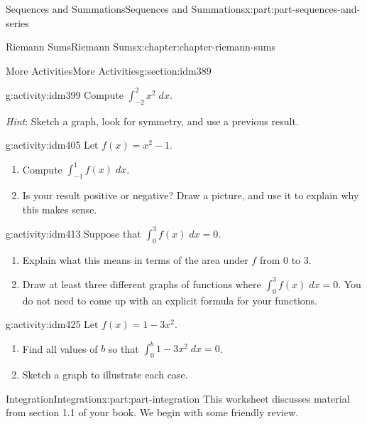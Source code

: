 \documentclass[oneside,10pt,]{book}
\begin{document}
\begin{partptx}{Sequences and Summations}{}{Sequences and Summations}{}{}{x:part:part-sequences-and-series}
\begin{chapterptx}{Riemann Sums}{}{Riemann Sums}{}{}{x:chapter:chapter-riemann-sums}
\begin{sectionptx}{More Activities}{}{More Activities}{}{}{g:section:idm389}
\begin{activity}{}{g:activity:idm399}
Compute \(\displaystyle\int_{-2}^2 x^2 \;dx\).%
\par
\emph{Hint}: Sketch a graph, look for symmetry, and use a previous result.%
\end{activity}
\begin{activity}{}{g:activity:idm405}%
Let \(f(x) = x^2 -1 \).%
\begin{enumerate}[font=\bfseries,label=(\alph*),ref=\alph*]
\item{}Compute \(\displaystyle \int_{-1}^1 f(x)\; dx\).\item{}Is your result positive or negative? Draw a picture, and use it to explain why this makes sense.%
\end{enumerate}
\end{activity}
\begin{activity}{}{g:activity:idm413}%
Suppose that \(\displaystyle \int_0^3 f(x)\;dx = 0\).%
\begin{enumerate}[font=\bfseries,label=(\alph*),ref=\alph*]
\item{}Explain what this means in terms of the area under \(f\) from \(0\) to \(3\).%
\item{}Draw at least three different graphs of functions where \(\displaystyle \int_0^3 f(x)\;dx = 0\). You do not need to come up with an explicit formula for your functions.%
\end{enumerate}
\end{activity}
\begin{activity}{}{g:activity:idm425}%
Let \(f(x) = 1-3x^2\).%
\begin{enumerate}[font=\bfseries,label=(\alph*),ref=\alph*]
\item{}Find all values of \(b\) so that \(\displaystyle\int_0^b 1-3x^2\; dx = 0\).%
\item{}Sketch a graph to illustrate each case.%
\end{enumerate}
\end{activity}
\end{sectionptx}
\end{chapterptx}
\end{partptx}
%
%
\typeout{************************************************}
\typeout{************************************************}
%
\begin{partptx}{Integration}{}{Integration}{}{}{x:part:part-integration}
 This worksheet discusses material from section 1.1 of your book. We begin with some friendly review.%
\end{partptx}
\end{document}
